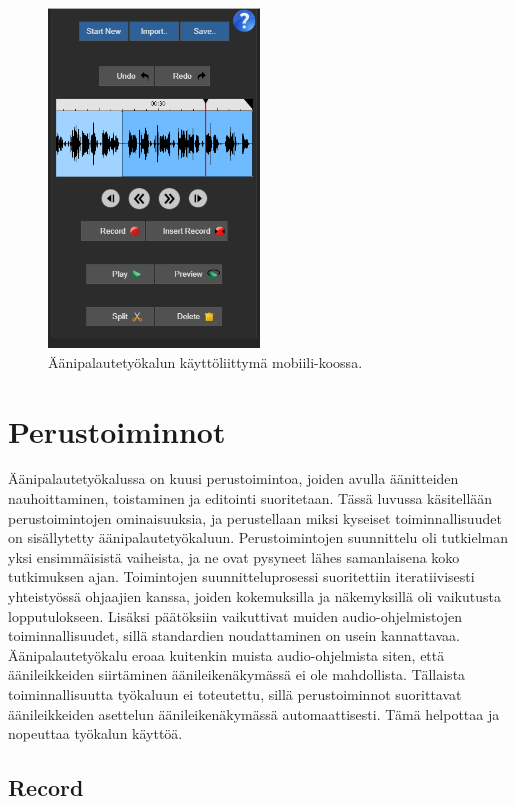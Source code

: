 \documentclass[utf8]{gradu3}
\begin{document}
\begin{figure}[H]\centering
  \includegraphics[height=9cm,keepaspectratio]{UI_mobile_1}
  \caption{Äänipalautetyökalun käyttöliittymä mobiili-koossa.}
  \label{fig:UI_mobile}
\end{figure}

\section{Perustoiminnot}

Äänipalautetyökalussa on kuusi perustoimintoa, joiden avulla äänitteiden nauhoittaminen, toistaminen ja editointi suoritetaan. Tässä luvussa käsitellään perustoimintojen ominaisuuksia, ja perustellaan miksi kyseiset toiminnallisuudet on sisällytetty äänipalautetyökaluun. Perustoimintojen suunnittelu oli tutkielman yksi ensimmäisistä vaiheista, ja ne ovat pysyneet lähes samanlaisena koko tutkimuksen ajan. Toimintojen suunnitteluprosessi suoritettiin iteratiivisesti yhteistyössä ohjaajien kanssa, joiden kokemuksilla ja näkemyksillä oli vaikutusta lopputulokseen. Lisäksi päätöksiin vaikuttivat muiden audio-ohjelmistojen toiminnallisuudet, sillä standardien noudattaminen on usein kannattavaa. Äänipalautetyökalu eroaa kuitenkin muista audio-ohjelmista siten, että äänileikkeiden siirtäminen äänileikenäkymässä ei ole mahdollista. Tällaista toiminnallisuutta työkaluun ei toteutettu, sillä perustoiminnot suorittavat äänileikkeiden asettelun äänileikenäkymässä automaattisesti. Tämä helpottaa ja nopeuttaa työkalun käyttöä.

\subsection{Record}
\end{document}

